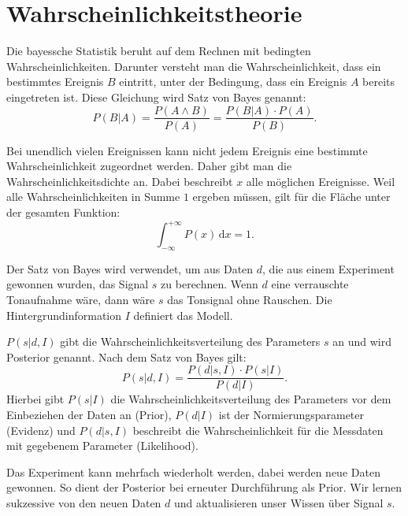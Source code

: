 \section{Wahrscheinlichkeitstheorie}\label{k4.2.bayes}

Die bayessche Statistik beruht auf dem Rechnen mit bedingten Wahrscheinlichkeiten.
Darunter versteht man die Wahrscheinlichkeit, dass ein bestimmtes Ereignis $B$ eintritt, unter der Bedingung, dass ein Ereignis $A$ bereits eingetreten ist.
Diese Gleichung wird Satz von Bayes genannt:
\begin{equation}
P(B|A) = \frac{P(A \wedge B)}{P(A)} = \frac{P(B|A)\cdot P(A)}{P(B)}.
\end{equation}

Bei unendlich vielen Ereignissen kann nicht jedem Ereignis eine bestimmte Wahrscheinlichkeit zugeordnet werden.
Daher gibt man die Wahrscheinlichkeitsdichte an.
Dabei beschreibt $x$ alle möglichen Ereignisse.
Weil alle Wahrscheinlichkeiten in Summe $1$ ergeben müssen, gilt für die Fläche unter der gesamten Funktion:
\begin{equation}
\int_{- \infty }^ {+ \infty} P(x) \,\mbox{d}x = 1.
\end{equation}

Der Satz von Bayes wird verwendet, um aus Daten $d$, die aus einem Experiment gewonnen wurden, das Signal $s$ zu berechnen.
Wenn $d$ eine verrauschte Tonaufnahme wäre, dann wäre $s$ das Tonsignal ohne Rauschen.
Die Hintergrundinformation $I$ definiert das Modell.

$P(s|d,I)$ gibt die Wahrscheinlichkeitsverteilung des Parameters $s$ an und wird Posterior genannt. Nach dem Satz von Bayes gilt:
\begin{equation}
P(s|d,I) = \frac{P(d|s,I)\cdot P(s|I)}{P(d|I)}.
\end{equation}
Hierbei gibt $P(s|I)$ die Wahrscheinlichkeitsverteilung des Parameters vor dem Einbeziehen der Daten an (Prior),
$P(d|I)$ ist der Normierungsparameter (Evidenz)
und $P(d|s,I)$ beschreibt die Wahrscheinlichkeit für die Messdaten mit gegebenem Parameter (Likelihood).

Das Experiment kann mehrfach wiederholt werden, dabei werden neue Daten gewonnen.
So dient der Posterior bei erneuter Durchführung als Prior.
Wir lernen sukzessive von den neuen Daten $d$ und aktualisieren unser Wissen über Signal $s$.
